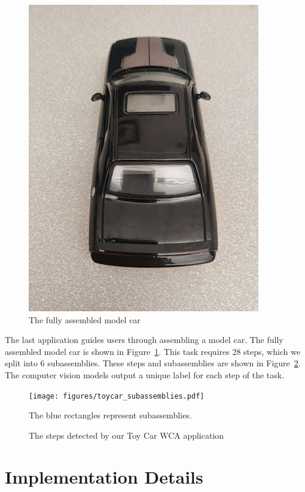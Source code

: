 \begin{figure}
  \includegraphics{figures/full_toycar.jpg}
  \caption{
    The fully assembled model car
  }\label{fig:full_toycar}
\end{figure}

The last application guides users through assembling a model car.
The fully assembled model car is shown in Figure~\ref{fig:full_toycar}.
This task requires 28 steps, which we split into 6 subassemblies.
These steps and subassemblies are shown in Figure~\ref{fig:toy_car}.
The computer vision models output a unique label for each step of the task.

\begin{figure}
  \texttt{[image: figures/toycar\_subassemblies.pdf]}
  \begin{captiontext}
    The blue rectangles represent subassemblies.
  \end{captiontext}
  \caption{
    The steps detected by our Toy Car WCA application
  }\label{fig:toy_car}
\end{figure}

\section{Implementation Details}\label{sec:implementation_details}

